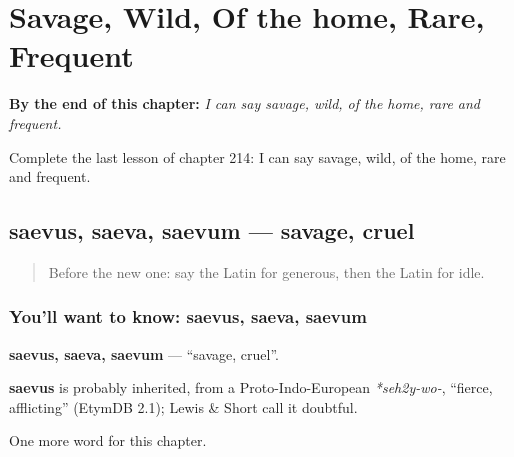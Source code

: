 
\chapter{Savage, Wild, Of the home, Rare, Frequent}
\label{ch:la-savage-wild-of-the-home-rare-frequent}

\begin{chapteropening}
\textbf{By the end of this chapter:} \emph{I can say savage, wild, of the home, rare and frequent.}

Complete the last lesson of chapter 214: I can say savage, wild, of the home, rare and frequent.
\end{chapteropening}

\section[saevus, saeva, saevum]{saevus, saeva, saevum — savage, cruel}

\label{lesson:LA-C214-saevus}



\begin{quote}
Before the new one: say the Latin for generous, then the Latin for idle.
\end{quote}

\subsection*{You'll want to know: saevus, saeva, saevum}
\textbf{saevus, saeva, saevum} — \textquotedblleft{}savage, cruel\textquotedblright{}.

\begin{cousinweb}
\textbf{saevus} is probably inherited, from a Proto-Indo-European \emph{*seh2y-wo-}, \textquotedblleft{}fierce, afflicting\textquotedblright{} (EtymDB 2.1); Lewis \& Short call it doubtful.
\end{cousinweb}

\begin{grammarlens}[title={What you've built}]
One more word for this chapter.
\end{grammarlens}

